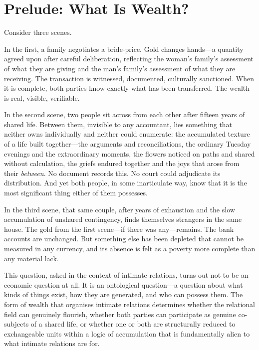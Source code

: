 \section{Prelude: What Is Wealth?}
\label{p15:sec:prelude}

\noindent
Consider three scenes.

In the first, a family negotiates a bride-price. Gold changes hands---a quantity agreed upon after careful deliberation, reflecting the woman's family's assessment of what they are giving and the man's family's assessment of what they are receiving. The transaction is witnessed, documented, culturally sanctioned. When it is complete, both parties know exactly what has been transferred. The wealth is real, visible, verifiable.

In the second scene, two people sit across from each other after fifteen years of shared life. Between them, invisible to any accountant, lies something that neither owns individually and neither could enumerate: the accumulated texture of a life built together---the arguments and reconciliations, the ordinary Tuesday evenings and the extraordinary moments, the flowers noticed on paths and shared without calculation, the griefs endured together and the joys that arose from their \emph{between}. No document records this. No court could adjudicate its distribution. And yet both people, in some inarticulate way, know that it is the most significant thing either of them possesses.

In the third scene, that same couple, after years of exhaustion and the slow accumulation of unshared contingency, finds themselves strangers in the same house. The gold from the first scene---if there was any---remains. The bank accounts are unchanged. But something else has been depleted that cannot be measured in any currency, and its absence is felt as a poverty more complete than any material lack.


This question, asked in the context of intimate relations, turns out not to be an economic question at all. It is an ontological question---a question about what kinds of things exist, how they are generated, and who can possess them. The form of wealth that organises intimate relations determines whether the relational field can genuinely flourish, whether both parties can participate as genuine co-subjects of a shared life, or whether one or both are structurally reduced to exchangeable units within a logic of accumulation that is fundamentally alien to what intimate relations are for.

